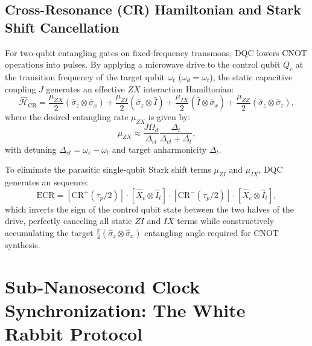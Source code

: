 \subsection{Cross-Resonance (CR) Hamiltonian and Stark Shift Cancellation}
For two-qubit entangling gates on fixed-frequency transmons, DQC lowers CNOT operations into  pulses. By applying a microwave drive to the control qubit $Q_c$ at the transition frequency of the target qubit $\omega_t$ ($\omega_d = \omega_t$), the static capacitive coupling $J$ generates an effective $ZX$ interaction Hamiltonian:
\begin{equation}
    \hat{\mathcal{H}}_{\text{CR}} = \frac{\mu_{ZX}}{2} (\hat{\sigma}_z \otimes \hat{\sigma}_x) + \frac{\mu_{ZI}}{2} (\hat{\sigma}_z \otimes \hat{I}) + \frac{\mu_{IX}}{2} (\hat{I} \otimes \hat{\sigma}_x) + \frac{\mu_{ZZ}}{2} (\hat{\sigma}_z \otimes \hat{\sigma}_z),
    \label{eq:cr_hamiltonian_ch12}
\end{equation}
where the desired entangling rate $\mu_{ZX}$ is given by:
\begin{equation}
    \mu_{ZX} \approx \frac{J \Omega_d}{\Delta_{ct}} \frac{\Delta_t}{\Delta_{ct} + \Delta_t},
    \label{eq:cr_rate_derivation}
\end{equation}
with detuning $\Delta_{ct} = \omega_c - \omega_t$ and target anharmonicity $\Delta_t$.

To eliminate the parasitic single-qubit Stark shift terms $\mu_{ZI}$ and $\mu_{IX}$, DQC generates an  sequence:
\begin{equation}
    \text{ECR} = \left[ \text{CR}^+(\tau_p / 2) \right] \cdot \left[ \hat{X}_c \otimes \hat{I}_t \right] \cdot \left[ \text{CR}^-(\tau_p / 2) \right] \cdot \left[ \hat{X}_c \otimes \hat{I}_t \right],
    \label{eq:ecr_sequence_ch12}
\end{equation}
which inverts the sign of the control qubit state between the two halves of the drive, perfectly canceling all static $ZI$ and $IX$ terms while constructively accumulating the target $\frac{\pi}{4}(\hat{\sigma}_z \otimes \hat{\sigma}_x)$ entangling angle required for CNOT synthesis.

\section{Sub-Nanosecond Clock Synchronization: The White Rabbit Protocol}
\label{sec:white_rabbit_sync}


